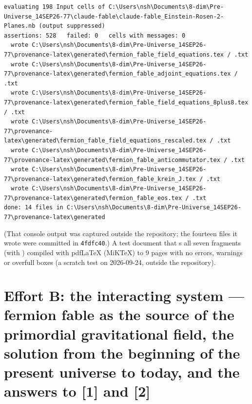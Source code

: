 \begin{Verbatim}[fontsize=\scriptsize]
evaluating 198 Input cells of C:\Users\nsh\Documents\8-dim\Pre-Universe_14SEP26-77\claude-fable\claude-fable_Einstein-Rosen-2-Planes.nb (output suppressed)
assertions: 528   failed: 0   cells with messages: 0
  wrote C:\Users\nsh\Documents\8-dim\Pre-Universe_14SEP26-77\provenance-latex\generated\fermion_fable_field_equations.tex / .txt
  wrote C:\Users\nsh\Documents\8-dim\Pre-Universe_14SEP26-77\provenance-latex\generated\fermion_fable_adjoint_equations.tex / .txt
  wrote C:\Users\nsh\Documents\8-dim\Pre-Universe_14SEP26-77\provenance-latex\generated\fermion_fable_field_equations_8plus8.tex / .txt
  wrote C:\Users\nsh\Documents\8-dim\Pre-Universe_14SEP26-77\provenance-latex\generated\fermion_fable_field_equations_rescaled.tex / .txt
  wrote C:\Users\nsh\Documents\8-dim\Pre-Universe_14SEP26-77\provenance-latex\generated\fermion_fable_anticommutator.tex / .txt
  wrote C:\Users\nsh\Documents\8-dim\Pre-Universe_14SEP26-77\provenance-latex\generated\fermion_fable_krein_J.tex / .txt
  wrote C:\Users\nsh\Documents\8-dim\Pre-Universe_14SEP26-77\provenance-latex\generated\fermion_fable_eos.tex / .txt
done: 14 files in C:\Users\nsh\Documents\8-dim\Pre-Universe_14SEP26-77\provenance-latex\generated
\end{Verbatim}

(That console output was captured outside the repository; the fourteen files it wrote were committed
in \texttt{4fdfc40}.) A test document that \verb||s all seven  fragments (with
) compiled with pdfLaTeX (MiKTeX) to 9 pages with no errors, warnings or overfull
boxes (a scratch test on 2026-09-24, outside the repository).

\section{Effort B: the interacting system --- fermion fable as the source of the primordial gravitational field, the solution from the beginning of the present universe to today, and the answers to [1] and [2]}
\label{sec:4}

